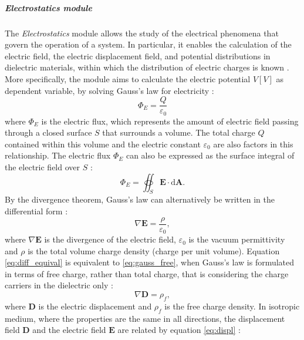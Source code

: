 \subparagraph{Electrostatics module}
The \emph{Electrostatics} module allows the study of the electrical phenomena that govern the operation of a system. In particular, it enables the calculation of the electric field, the electric displacement field, and potential distributions in dielectric materials, within which the distribution of electric charges is known \citep{comsolCOMSOL_manual}. More specifically, the module aims to calculate the electric potential $V [V]$ as dependent variable, by solving Gauss's law for electricity \citep{grantElectromagnetism2008}:
%
\begin{equation}
    \Phi_E = \dfrac{Q}{\varepsilon_0}
\end{equation}
%
where $\Phi_E$ is the electric flux, which represents the amount of electric field passing through a closed surface $S$ that surrounds a volume. The total charge $Q$ contained within this volume and the electric constant $\varepsilon_0$ are also factors in this relationship. The electric flux $\Phi_E$ can also be expressed as the surface integral of the electric field over $S$ \citep{purcellElectricity2013}: %
%
\begin{equation}
    \Phi _{E}= \oiint_S \mathbf {E} \cdot \mathrm {d} \mathbf {A}.
\end{equation}
%
By the divergence theorem, Gauss's law can alternatively be written in the differential form \citep{purcellElectricity2013}: %
%
\begin{equation}
    \label{eq:diff_equival}
     \nabla \mathbf{E} = \dfrac{\rho}{\varepsilon_0},
\end{equation}
%
where $\nabla \mathbf{E}$ is the divergence of the electric field, $\varepsilon_0$ is the vacuum permittivity and $\rho$ is the total volume charge density (charge per unit volume).
Equation \eqref{eq:diff_equival} is equivalent to \eqref{eq:gauss_free}, when Gauss's law is formulated in terms of free charge, rather than total charge, that is considering the charge carriers in the dielectric only \citep{griffithsIntroduction2023}:
%
\begin{equation}
    \label{eq:gauss_free}
    \nabla \mathbf{D} = \rho_f ,
\end{equation}
%
where $\mathbf{D}$ is the electric displacement and $\rho_f$ is the free charge density. In isotropic medium, where the properties are the same in all directions, the displacement field $\mathbf{D}$ and the electric field $\mathbf{E}$ are related by equation \eqref{eq:displ} \citep{griffithsIntroduction2023}: %
